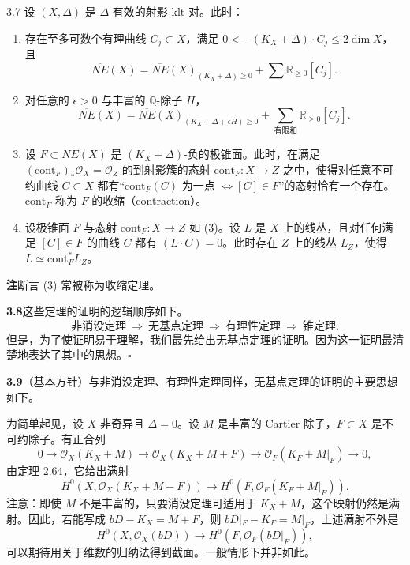 \begin{theorem*}[{锥定理}]{3.7}
设 $(X,\Delta)$ 是 $\Delta$ 有效的射影 klt 对。此时：
\begin{enumerate}[label=(\arabic*),leftmargin=2.4em,itemsep=3pt,topsep=2pt,parsep=0pt]
\item 存在至多可数个有理曲线 $C_j\subset X$，满足 $0<-(K_X+\Delta)\cdot C_j\leq 2\dim X$，且
\[
\overline{NE}(X)=\overline{NE}(X)_{(K_X+\Delta)\geq 0}+\sum\mathbb{R}_{\geq 0}[C_j].
\]
\item 对任意的 $\epsilon>0$ 与丰富的 $\mathbb{Q}$-除子 $H$，
\[
\overline{NE}(X)=\overline{NE}(X)_{(K_X+\Delta+\epsilon H)\geq 0}
+\sum_{\text{有限和}}\mathbb{R}_{\geq 0}[C_j].
\]
\item 设 $F\subset\overline{NE}(X)$ 是 $(K_X+\Delta)$-负的极锥面。此时，在满足 $(\mathrm{cont}_F)_*\mathcal{O}_X=\mathcal{O}_Z$ 的到射影簇的态射 $\mathrm{cont}_F:X\to Z$ 之中，使得对任意不可约曲线 $C\subset X$ 都有“$\mathrm{cont}_F(C)$ 为一点 $\Leftrightarrow[C]\in F$”的态射恰有一个存在。
$\mathrm{cont}_F$ 称为 $F$ 的收缩（contraction）。
\item 设极锥面 $F$ 与态射 $\mathrm{cont}_F:X\to Z$ 如 (3)。设 $L$ 是 $X$ 上的线丛，且对任何满足 $[C]\in F$ 的曲线 $C$ 都有 $(L\cdot C)=0$。此时存在 $Z$ 上的线丛 $L_Z$，使得 $L\simeq\mathrm{cont}_F^*L_Z$。
\end{enumerate}
\end{theorem*}

\par\medskip\noindent\textbf{注}\quad 断言 (3) 常被称为收缩定理。\par\medskip

\par\medskip\noindent\textbf{3.8}\quad 这些定理的证明的逻辑顺序如下。
\[
\text{非消没定理}\ \Rightarrow\ \text{无基点定理}\ \Rightarrow\ \text{有理性定理}\ \Rightarrow\ \text{锥定理}.
\]
但是，为了使证明易于理解，我们最先给出无基点定理的证明。因为这一证明最清楚地表达了其中的思想。\hfill$\square$\par\medskip

\par\medskip\noindent\textbf{3.9}（基本方针）\quad 与非消没定理、有理性定理同样，无基点定理的证明的主要思想如下。\par
为简单起见，设 $X$ 非奇异且 $\Delta=0$。设 $M$ 是丰富的 Cartier 除子，$F\subset X$ 是不可约除子。有正合列
\[
0\to\mathcal{O}_X(K_X+M)\to\mathcal{O}_X(K_X+M+F)\to\mathcal{O}_F(K_F+M|_F)\to 0,
\]
由定理 2.64，它给出满射
\[
H^0(X,\mathcal{O}_X(K_X+M+F))\to H^0(F,\mathcal{O}_F(K_F+M|_F)).
\]
注意：即使 $M$ 不是丰富的，只要消没定理可适用于 $K_X+M$，这个映射仍然是满射。因此，若能写成 $bD-K_X=M+F$，则 $bD|_F-K_F=M|_F$，上述满射不外是
\[
H^0(X,\mathcal{O}_X(bD))\to H^0(F,\mathcal{O}_F(bD|_F)),
\]
可以期待用关于维数的归纳法得到截面。一般情形下并非如此。

